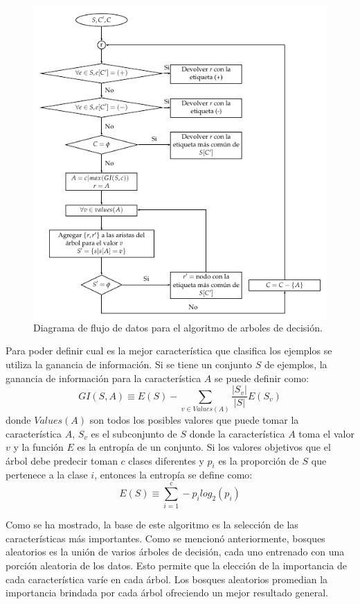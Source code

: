 \begin{figure}[t]
    \centering
    \includegraphics[width=\linewidth]{Images/flow_diagram.png}
    \caption{Diagrama de flujo de datos para el algoritmo de arboles de decisión.}
    \label{fig:flow_diagram}
\end{figure}

Para poder definir cual es la mejor característica que clasifica los ejemplos se utiliza la ganancia de información. Si se tiene un conjunto $S$ de ejemplos, la ganancia de información para la característica $A$ se puede definir como:
\[GI(S, A) \equiv E(S) - \sum_{v \in Values(A)} \frac{|S_{v}|}{|S|}E(S_{v})\]
donde $Values(A)$ son todos los posibles valores que puede tomar la característica $A$, $S_{v}$ es el subconjunto de $S$ donde la característica $A$ toma el valor $v$ y la función $E$ es la entropía de un conjunto. Si los valores objetivos que el árbol debe predecir toman $c$ clases diferentes y $p_{i}$ es la proporción de $S$ que pertenece a la clase $i$, entonces la entropía se define como:
\[E(S) \equiv \sum_{i=1}^c -p_{i}log_{2}(p_{i})\]

Como se ha mostrado, la base de este algoritmo es la selección de las  características más importantes. Como se mencionó anteriormente, bosques aleatorios es la unión de varios árboles de decisión, cada uno entrenado con una porción aleatoria de los datos. Esto permite que la elección de la importancia de cada característica varíe en cada árbol. Los bosques aleatorios promedian la importancia brindada por cada árbol ofreciendo un mejor resultado general.